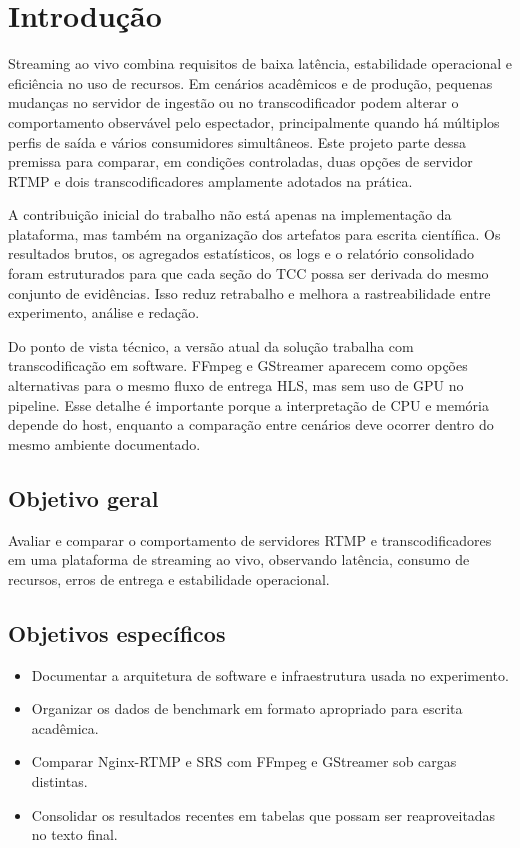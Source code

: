 \section{Introdução}

Streaming ao vivo combina requisitos de baixa latência, estabilidade operacional e eficiência no uso de recursos. Em cenários acadêmicos e de produção, pequenas mudanças no servidor de ingestão ou no transcodificador podem alterar o comportamento observável pelo espectador, principalmente quando há múltiplos perfis de saída e vários consumidores simultâneos. Este projeto parte dessa premissa para comparar, em condições controladas, duas opções de servidor RTMP e dois transcodificadores amplamente adotados na prática.

A contribuição inicial do trabalho não está apenas na implementação da plataforma, mas também na organização dos artefatos para escrita científica. Os resultados brutos, os agregados estatísticos, os logs e o relatório consolidado foram estruturados para que cada seção do TCC possa ser derivada do mesmo conjunto de evidências. Isso reduz retrabalho e melhora a rastreabilidade entre experimento, análise e redação.

Do ponto de vista técnico, a versão atual da solução trabalha com transcodificação em software. FFmpeg e GStreamer aparecem como opções alternativas para o mesmo fluxo de entrega HLS, mas sem uso de GPU no pipeline. Esse detalhe é importante porque a interpretação de CPU e memória depende do host, enquanto a comparação entre cenários deve ocorrer dentro do mesmo ambiente documentado.

\subsection{Objetivo geral}

Avaliar e comparar o comportamento de servidores RTMP e transcodificadores em uma plataforma de streaming ao vivo, observando latência, consumo de recursos, erros de entrega e estabilidade operacional.

\subsection{Objetivos específicos}

\begin{itemize}[leftmargin=1.2cm]
  \item Documentar a arquitetura de software e infraestrutura usada no experimento.
  \item Organizar os dados de benchmark em formato apropriado para escrita acadêmica.
  \item Comparar Nginx-RTMP e SRS com FFmpeg e GStreamer sob cargas distintas.
  \item Consolidar os resultados recentes em tabelas que possam ser reaproveitadas no texto final.
\end{itemize}